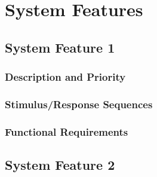 \chapter{System Features}
\label{chapt-system-features}

\section{System Feature 1}

\subsection{Description and Priority}

\subsection{Stimulus/Response Sequences}

\subsection{Functional Requirements}

\section{System Feature 2}
